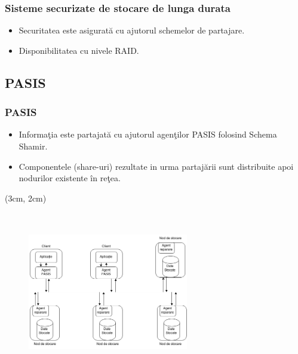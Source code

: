 \documentclass{beamer}
\begin{document}
\begin{frame}
    \frametitle{Sisteme securizate de stocare de lunga durata}
    \begin{itemize}
        \item Securitatea este asigurat\u{a} cu ajutorul schemelor de partajare.
        \pause
        \item Disponibilitatea cu nivele RAID.
    \end{itemize}
\end{frame}


\subsection{PASIS}

\begin{frame}
    \frametitle{PASIS}
     {
        \begin{itemize}
            \item Informa\c{t}ia este partajat\u{a} cu ajutorul agen\c{t}ilor PASIS folosind Schema Shamir.
            \pause
            \item Componentele (share-uri) rezultate in urma partaj\u{a}rii sunt distribuite apoi nodurilor existente \^{i}n re\c{t}ea.
        \end{itemize}
    }
     {
         \begin{textblock*}{4cm}(3cm, 2cm)
            \begin{figure}
                \includegraphics[width=7cm,height=7cm,keepaspectratio]{img/raid/PASIS.png}
           \end{figure}
        \end{textblock*}
    }
\end{frame}
\end{document}
